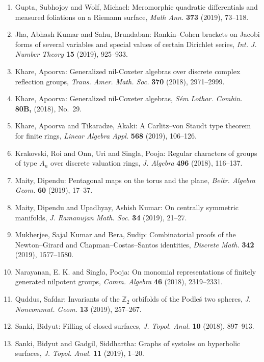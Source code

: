 \begin{enumerate}[resume, leftmargin=27pt]
	\item\label{gupta:measured-foliations} Gupta, Subhojoy and Wolf, Michael: Meromorphic quadratic differentials and measured foliations on a Riemann surface, {\em Math Ann.} {\bf 373} (2019), 73--118.

	\item Jha, Abhash Kumar and Sahu, Brundaban: Rankin--{C}ohen brackets on {J}acobi forms of several variables
	      and special values of certain {D}irichlet series, {\em Int. J. Number Theory} {\bf 15} (2019), 925--933.

	\item Khare, Apoorva: Generalized nil-{C}oxeter algebras over discrete complex
	      reflection groups, {\em Trans. Amer. Math. Soc.} {\bf 370} (2018), 2971--2999.

	\item Khare, Apoorva: Generalized nil-Coxeter algebras, {\em S\'em Lothar. Combin.} {\bf 80B,} (2018), No.~29.

	\item Khare, Apoorva and Tikaradze, Akaki: A {C}arlitz--von {S}taudt type theorem for finite rings,
	      {\em Linear Algebra Appl.} {\bf 568} (2019), 106--126.

	\item Krakovski, Roi and Onn, Uri and Singla, Pooja: Regular characters of groups of type {$A_n$} over
	      discrete valuation rings, {\em J. Algebra} {\bf 496} (2018), 116--137.

	\item Maity, Dipendu: Pentagonal maps on the torus and the plane, {\em Beitr. Algebra Geom.} {\bf 60} (2019), 17--37.

	\item Maity, Dipendu and Upadhyay, Ashish Kumar: On centrally symmetric manifolds, {\em J. Ramanujan Math. Soc.} {\bf 34}
	      (2019), 21--27.

	\item Mukherjee, Sajal Kumar and Bera, Sudip: Combinatorial proofs of the {N}ewton--{G}irard and
		      {C}hapman--{C}ostas--{S}antos identities, {\em Discrete Math.} {\bf 342} (2019), 1577--1580.

	\item Narayanan, E. K. and Singla, Pooja: On monomial representations of finitely generated nilpotent
	      groups, {\em Comm. Algebra} {\bf 46} (2018), 2319--2331.

	\item Quddus, Safdar: Invariants of the {$\mathbb Z_2$} orbifolds of the {P}odle\'{s} two
	      spheres, {\em J. Noncommut. Geom.} {\bf 13} (2019), 257--267.

	\item Sanki, Bidyut: Filling of closed surfaces, {\em J. Topol. Anal.} {\bf 10} (2018), 897--913.

	\item Sanki, Bidyut and Gadgil, Siddhartha: Graphs of systoles on hyperbolic surfaces, {\em J. Topol. Anal.}
		      {\bf 11} (2019), 1--20.

\end{enumerate}
\vspace{0.5mm}


